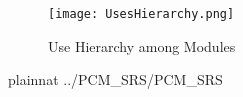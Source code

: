 \documentclass[12pt]{article}
\begin{document}
\begin{figure}[H]
\centering
\texttt{[image: UsesHierarchy.png]}
\caption{Use Hierarchy among Modules}
\label{FigUH}
\end{figure}


 {plainnat}
 {../PCM_SRS/PCM_SRS}
\end{document}
